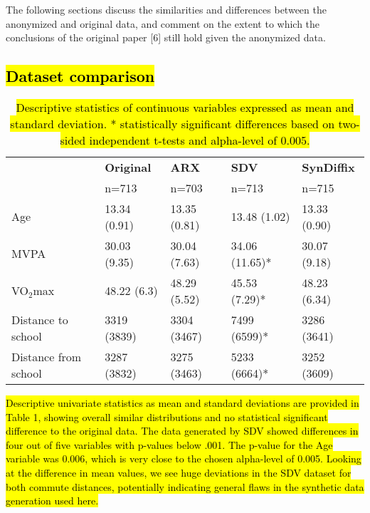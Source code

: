 \documentclass[10pt]{article}
\newcommand{\mycite}[1]{[#1]}
\begin{document}
The following sections discuss the similarities and differences between the anonymized and original data, and comment on the extent to which the conclusions of the original paper \mycite{6} still hold given the anonymized data.

\subsection*{\hl{Dataset comparison}}

\setlength{\fboxsep}{0pt}
\begin{table}
      \begin{center}
      \begin{small}
\begin{tabular}{lllll}
\toprule
 & \textbf{Original}  & \textbf{ARX} & \textbf{SDV} & \textbf{SynDiffix} \\
 & n=713 & n=703  & n=713  & n=715   \\
\midrule
Age & 13.34 (0.91) & 13.35 (0.81)  & 13.48 (1.02)  & 13.33 (0.90) \\
MVPA & 30.03 (9.35) & 30.04 (7.63) & 34.06 (11.65)* & 30.07 (9.18) \\
VO$_2$max & 48.22 (6.3) & 48.29 (5.52)  & 45.53 (7.29)*  & 48.23 (6.34) \\
Distance to school & 3319 (3839) & 3304 (3467) & 7499 (6599)* & 3286 (3641) \\
Distance from school & 3287 (3832) & 3275 (3463) & 5233 (6664)* & 3252 (3609) \\
\bottomrule
\end{tabular}
      \end{small}
      \caption{\hl{Descriptive statistics of continuous variables expressed as mean and standard deviation. * statistically significant differences based on two-sided independent t-tests and alpha-level of 0.005.}}
      \label{tab:table1new}
      \end{center}
      \end{table}
	\setlength{\fboxsep}{3pt}

\hl{Descriptive univariate statistics as mean and standard deviations are provided in Table 1, showing overall similar distributions and no statistical significant difference to the original data. The data generated by SDV showed differences in four out of five variables with p-values below .001. The p-value for the Age variable was 0.006, which is very close to the chosen alpha-level of 0.005. Looking at the difference in mean values, we see huge deviations in the SDV dataset for both commute distances, potentially indicating general flaws in the synthetic data generation used here.}
\end{document}
